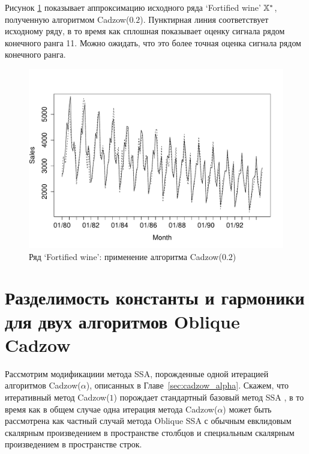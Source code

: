 \documentclass[12pt, specialist, subf,href,colorlinks=true,substylefile = spbu.rtx]{disser}
\theoremstyle{remark}
\theoremstyle{definition}
\begin{document}
Рисунок \ref{fig:rl} показывает аппроксимацию исходного ряда `Fortified wine' $\mathbb{X}^*$, полученную алгоритмом Cadzow($0.2$). 
Пунктирная линия соответствует исходному ряду, в то время как сплошная показывает оценку сигнала рядом конечного ранга 11.
Можно ожидать, что это более точная оценка сигнала рядом конечного ранга.

\begin{figure}[!hhh]
	\includegraphics[width = \columnwidth]{rlimage.pdf}
	\caption{Ряд `Fortified wine': применение алгоритма Cadzow($0.2$)}
	\label{fig:rl}
\end{figure}




\appendix 
\chapter{Разделимость константы и гармоники для двух алгоритмов Oblique Cadzow}
\label{sec:app}

Рассмотрим модификациии метода SSA, порожденные одной итерацией алгоритмов Cadzow($\alpha$), описанных в Главе~\ref{sec:cadzow_alpha}. Скажем, что итеративный метод Cadzow($1$) порождает стандартный базовый метод SSA \cite{Golyandina.etal2001,Golyandina.Zhigljavsky2012}, в то время как в общем случае одна итерация метода Cadzow($\alpha$) может быть рассмотрена как частный случай метода Oblique SSA \cite{Golyandina2013} с обычным евклидовым скалярным произведением в пространстве столбцов и специальным скалярным произведением в пространстве строк.
\end{document}
